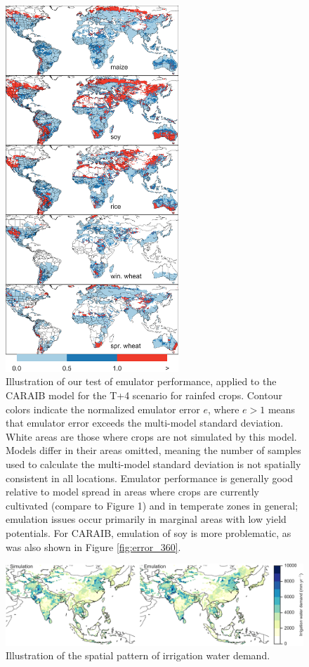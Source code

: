 \documentclass[gmd, manuscript]{copernicus} %
\begin{document}
\begin{figure}[ht]
\centering
    \includegraphics[width=6.5cm]{figures/em_err.png}
    \caption{Illustration of our test of emulator performance, applied to the CARAIB model for the T+4 scenario for rainfed crops. 
    Contour colors indicate the normalized emulator error $e$, where $e > 1$ means that emulator error exceeds the multi-model standard deviation. 
    White areas are those where crops are not simulated by this model. 
    Models differ in their areas omitted, meaning the number of samples used to calculate the multi-model standard deviation is not spatially consistent in all locations. 
    Emulator performance is generally good relative to model spread in areas where crops are currently cultivated (compare to Figure 1) and in temperate zones in general; emulation issues occur primarily in marginal areas with low yield potentials. 
    For CARAIB, emulation of soy is more problematic, as was also shown in Figure \ref{fig:error_360}.}
   \label{fig:error}
\end{figure}

\begin{figure}[ht]
\centering
    \includegraphics[width=16cm]{figures/irr_emulator_skill.png}
    \caption{Illustration of the spatial pattern of irrigation water demand.}
   \label{fig:error}
\end{figure}
\end{document}
